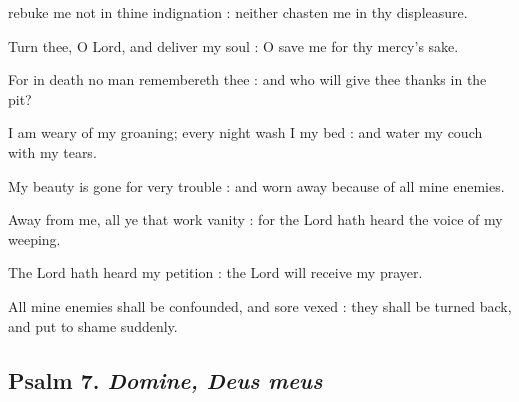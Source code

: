  rebuke me not in thine indignation : neither chasten me in thy displeasure.\par
{}
Turn thee, O Lord, and deliver my soul : O save me for thy mercy's sake.\par
{}For in death no man remembereth thee : and who will give thee thanks in the pit?\par
{}I am weary of my groaning; every night wash I my bed : and water my couch with my tears.\par
{}My beauty is gone for very trouble : and worn away because of all mine enemies.\par
{}Away from me, all ye that work vanity : for the Lord hath heard the voice of my weeping.\par
{}The Lord hath heard my petition : the Lord will receive my prayer.\par
{}All mine enemies shall be confounded, and sore vexed : they shall be turned back, and put to shame suddenly.\par

\subsection{Psalm 7. \textit{Domine, Deus meus}}

